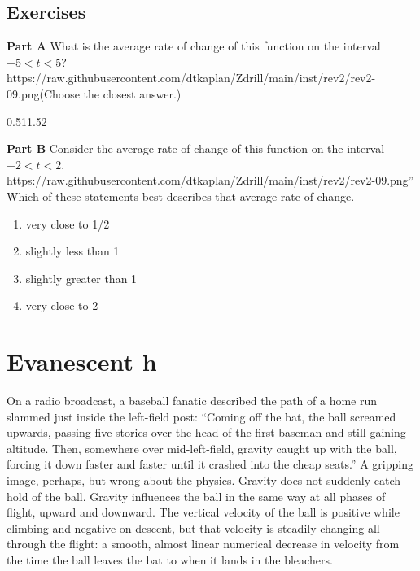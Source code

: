 \documentclass[
  letterpaper,
  DIV=11,
  numbers=noendperiod,
  oneside]{scrreprt}
\providecommand{\tightlist}{%
  \setlength{\itemsep}{0pt}\setlength{\parskip}{0pt}}
\begin{document}
\hypertarget{exercises-1}{%
\section{Exercises}\label{exercises-1}}

\textbf{Part A} What is the average rate of change of this function on
the interval
\(-5 < t < 5\)?https://raw.githubusercontent.com/dtkaplan/Zdrill/main/inst/rev2/rev2-09.png(Choose
the closest answer.)

0.5\hspace{3em}1\hspace{3em}1.5\hspace{3em}2

\textbf{Part B} Consider the average rate of change of this function on
the interval \(-2 < t < 2\).
https://raw.githubusercontent.com/dtkaplan/Zdrill/main/inst/rev2/rev2-09.png''
Which of these statements best describes that average rate of change.

\begin{enumerate}
\def\labelenumi{\alph{enumi}.}
\tightlist
\item
  very close to 1/2
\item
  slightly less than 1
\item
  slightly greater than 1
\item
  very close to 2
\end{enumerate}

\hypertarget{sec-evanescent-h}{%
\chapter{Evanescent h}\label{sec-evanescent-h}}

On a radio broadcast, a baseball fanatic described the path of a home
run slammed just inside the left-field post: ``Coming off the bat, the
ball screamed upwards, passing five stories over the head of the first
baseman and still gaining altitude. Then, somewhere over mid-left-field,
gravity caught up with the ball, forcing it down faster and faster until
it crashed into the cheap seats.'' A gripping image, perhaps, but wrong
about the physics. Gravity does not suddenly catch hold of the ball.
Gravity influences the ball in the same way at all phases of flight,
upward and downward. The vertical velocity of the ball is positive while
climbing and negative on descent, but that velocity is steadily changing
all through the flight: a smooth, almost linear numerical decrease in
velocity from the time the ball leaves the bat to when it lands in the
bleachers.
\end{document}
